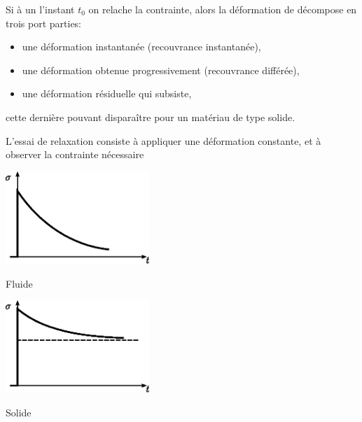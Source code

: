 Si à un l'instant $t_0$ on relache la contrainte, alors la déformation de décompose en trois port parties:
\begin{itemize}
    \item une déformation instantanée (recouvrance instantanée),
    \item une déformation obtenue progressivement (recouvrance différée),
    \item une déformation résiduelle qui subsiste,
\end{itemize}
cette dernière pouvant disparaître pour un matériau de type solide.

L'essai de relaxation consiste à appliquer une déformation constante, et à observer la contrainte nécessaire
\begin{multicols}{2}
    \begin{center}
        \includegraphics[height=3.5cm]{../images/T1_Ch04-0019}

        Fluide
    \end{center}
    \columnbreak
    \begin{center}
        \includegraphics[height=3.5cm]{../images/T1_Ch04-0020}

        Solide
    \end{center}
\end{multicols}

